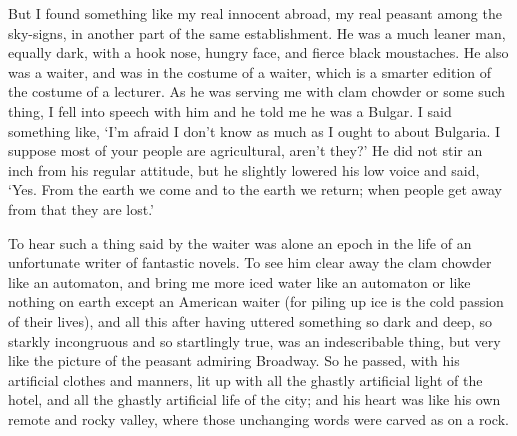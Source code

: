 \documentclass{book}
\begin{document}
But I found something like my real innocent abroad, my real peasant among the sky-signs, in another part of the same establishment. He was a much leaner man, equally dark, with a hook nose, hungry face, and fierce black moustaches. He also was a waiter, and was in the costume of a waiter, which is a smarter edition of the costume of a lecturer. As he was serving me with clam chowder or some such thing, I fell into speech with him and he told me he was a Bulgar. I said something like, ‘I’m afraid I don’t know as much as I ought to about Bulgaria. I suppose most of your people are agricultural, aren’t they?’ He did not stir an inch from his regular attitude, but he slightly lowered his low voice and said, ‘Yes. From the earth we come and to the earth we return; when people get away from that they are lost.’

To hear such a thing said by the waiter was alone an epoch in the life of an unfortunate writer of fantastic novels. To see him clear away the clam chowder like an automaton, and bring me more iced water like an automaton or like nothing on earth except an American waiter (for piling up ice is the cold passion of their lives), and all this after having uttered something so dark and deep, so starkly incongruous and so startlingly true, was an indescribable thing, but very like the picture of the peasant admiring Broadway. So he passed, with his artificial clothes and manners, lit up with all the ghastly artificial light of the hotel, and all the ghastly artificial life of the city; and his heart was like his own remote and rocky valley, where those unchanging words were carved as on a rock.
\end{document}

